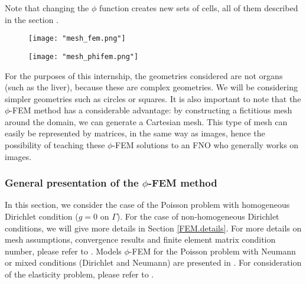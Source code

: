 \begin{Rem}
	Note that changing the $\phi$ function creates new sets of cells, all of them described in the section .
\end{Rem}

\begin{minipage}{0.52\linewidth}
	\begin{figure}[H]
		\centering
		\texttt{[image: "mesh\_fem.png"]}
		\label{mesh_fem}
	\end{figure}
\end{minipage} \;
\begin{minipage}{0.44\linewidth}
	\begin{figure}[H]
		\centering
		\texttt{[image: "mesh\_phifem.png"]}
		\label{mesh_phifem}
	\end{figure}
\end{minipage}

\begin{Rem}
	For the purposes of this internship, the geometries considered are not organs (such as the liver), because these are complex geometries. We will be considering simpler geometries such as circles or squares. It is also important to note that the $\phi$-FEM method has a considerable advantage: by constructing a fictitious mesh around the domain, we can generate a Cartesian mesh. This type of mesh can easily be represented by matrices, in the same way as images, hence the possibility of teaching these $\phi$-FEM solutions to an FNO who generally works on images. 
\end{Rem}

\subsubsection{General presentation of the $\phi$-FEM method}

In this section, we consider the case of the Poisson problem with homogeneous Dirichlet condition ($g=0$ on $\Gamma$). For the case of non-homogeneous Dirichlet conditions, we will give more details in Section \ref{FEM.details}. For more details on mesh assumptions, convergence results and finite element matrix condition number, please refer to \cite{duprez_phi-fem_2020}. Models $\phi$-FEM for the Poisson problem with Neumann or mixed conditions (Dirichlet and Neumann) are presented in \cite{duprez_new_2023,cotin_phi-fem_nodate}. For consideration of the elasticity problem, please refer to \cite{cotin_phi-fem_nodate}.


